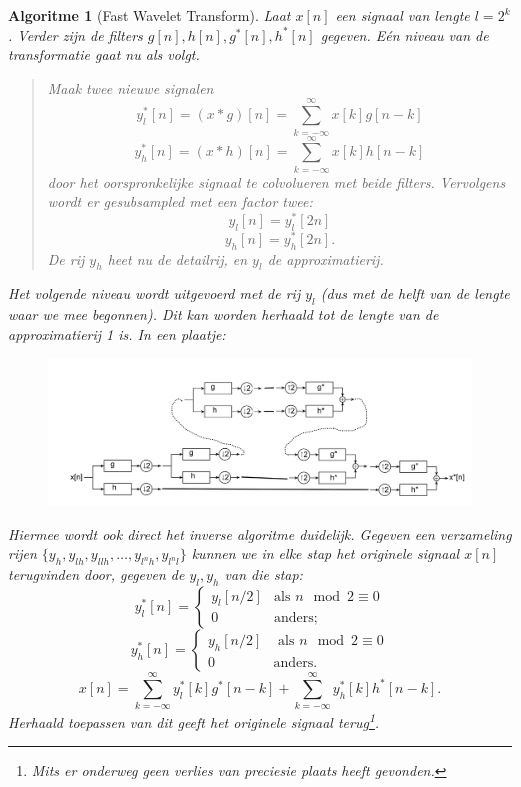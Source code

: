 \documentclass[11pt]{amsart}
\newtheorem*{algoritme}{Algoritme}
\begin{document}
\begin{algoritme}[Fast Wavelet Transform]
Laat $x[n]$ een signaal van lengte $l = 2^k$. Verder zijn de filters $g[n], h[n],g^*[n], h^*[n]$ gegeven. E\'en niveau van de transformatie gaat nu als volgt.

\begin{quote}
Maak twee nieuwe signalen 
\[
y_l^*[n] = (x * g)[n] = \sum_{k=-\infty}^\infty x[k]g[n-k]
\]
\[
y_h^*[n] = (x * h)[n] = \sum_{k=-\infty}^\infty x[k]h[n-k]
\]
door het oorspronkelijke signaal te colvolueren met beide filters. Vervolgens wordt er ge\emph{subsampled} met een factor twee:
\[
y_l[n] = y_l^*[2n]
\]
\[
y_h[n] = y_h^*[2n].
\]
De rij $y_h$ heet nu de \emph{detail}rij, en $y_l$ de \emph{approximatie}rij.
\end{quote}
Het volgende niveau wordt uitgevoerd met de rij $y_l$ (dus met de helft van de lengte waar we mee begonnen). Dit kan worden herhaald tot de lengte van de approximatierij 1 is. In een plaatje:
\begin{figure}[h]
\includegraphics{filter_bank_kankerzuur.jpg}
\end{figure}

Hiermee wordt ook direct het inverse algoritme duidelijk. Gegeven een verzameling rijen $\{y_h, y_{lh}, y_{llh}, \ldots, y_{l^nh}, y_{l^nl}\}$ kunnen we in elke stap het originele signaal $x[n]$ terugvinden door, gegeven de $y_l, y_h$ van die stap:
\[
	y^*_{l}[n] = \begin{cases} y_{l}[n/2] &\text{als } n \mod{2} \equiv 0 \\ 0 &\text{anders}; \end{cases}
\]
\[
	y^*_{h}[n] = \begin{cases} y_{h}[n/2] &\text{ als } n \mod{2} \equiv 0 \\ 0 &\text{anders}. \end{cases}
\]
\[
	x[n] = \sum_{k=-\infty}^\infty y^*_{l}[k]g^*[n-k] + \sum_{k=-\infty}^\infty y^*_{h}[k]h^*[n-k].
\]
Herhaald toepassen van dit geeft het originele signaal terug\footnote{Mits er onderweg geen verlies van preciesie plaats heeft gevonden.}.
\end{algoritme}
\end{document}
